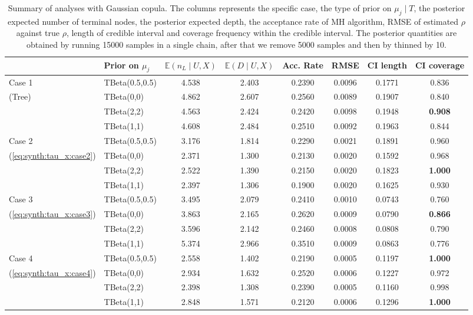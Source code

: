 \documentclass{amsart}
\begin{document}
\begin{table}[ht]
	\centering
	\caption{Summary of analyses with Gaussian copula. The columns represents the specific case, the type of prior on $\mu_j\mid T$, the posterior expected number of terminal nodes, the posterior expected depth, the acceptance rate of MH algorithm, RMSE of estimated $\rho$ against true $\rho$, length of credible interval and coverage frequency within the credible interval. The posterior quantities are obtained by running 15000 samples in a single chain, after that we remove 5000 samples and then by thinned by 10.}
	\label{tab:gauss:summary}
	\scriptsize{
	\begin{tabular}{ll|cccccc}
		\toprule
		& Prior on $\mu_j$ & $\mathbb{E}(n_L\mid U,X)$ & $\mathbb{E}(D\mid U,X)$ & Acc. Rate & RMSE & CI length & CI coverage \\ 
		\midrule
		Case 1 & TBeta(0.5,0.5) & 4.538 & 2.403 & 0.2390 & 0.0096 & 0.1771 & 0.836 \\ 
		(Tree) & TBeta(0,0) & 4.862 & 2.607 & 0.2560 & 0.0089 & 0.1907 & 0.840 \\ 
		& TBeta(2,2) & 4.563 & 2.424 & 0.2420 & 0.0098 & 0.1948 & \textbf{0.908} \\ 
		& TBeta(1,1) & 4.608 & 2.484 & 0.2510 & 0.0092 & 0.1963 & 0.844 \\ 
		\midrule
		Case 2 & TBeta(0.5,0.5) & 3.176 & 1.814 & 0.2290 & 0.0021 & 0.1891 & 0.960 \\ 
		(\cref{eq:synth:tau_x:case2}) & TBeta(0,0) & 2.371 & 1.300 & 0.2130 & 0.0020 & 0.1592 & 0.968 \\ 
		& TBeta(2,2) & 2.522 & 1.390 & 0.2150 & 0.0020 & 0.1823 & \textbf{1.000} \\ 
		& TBeta(1,1) & 2.397 & 1.306 & 0.1900 & 0.0020 & 0.1625 & 0.930 \\ 
		\midrule
		Case 3 & TBeta(0.5,0.5) & 3.495 & 2.079 & 0.2410 & 0.0010 & 0.0743 & 0.760 \\ 
		(\cref{eq:synth:tau_x:case3}) & TBeta(0,0) & 3.863 & 2.165 & 0.2620 & 0.0009 & 0.0790 & \textbf{0.866} \\ 
		& TBeta(2,2) & 3.596 & 2.142 & 0.2460 & 0.0008 & 0.0808 & 0.790 \\ 
		& TBeta(1,1) & 5.374 & 2.966 & 0.3510 & 0.0009 & 0.0863 & 0.776 \\ 
		\midrule
		Case 4 & TBeta(0.5,0.5) & 2.558 & 1.402 & 0.2190 & 0.0005 & 0.1197 & \textbf{1.000} \\ 
		(\cref{eq:synth:tau_x:case4}) & TBeta(0,0) & 2.934 & 1.632 & 0.2520 & 0.0006 & 0.1227 & 0.972 \\ 
		& TBeta(2,2) & 2.398 & 1.308 & 0.2390 & 0.0005 & 0.1160 & 0.998 \\ 
		& TBeta(1,1) & 2.848 & 1.571 & 0.2120 & 0.0006 & 0.1296 & \textbf{1.000} \\ 
		\end{tabular}}
\end{table}
\end{document}

